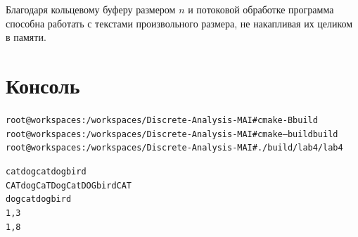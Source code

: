Благодаря кольцевому буферу размером $n$ и потоковой обработке программа способна работать с текстами произвольного размера, не накапливая их целиком в памяти.

\pagebreak

\section{Консоль}

\begin{alltt}
root@workspaces:/workspaces/Discrete-Analysis-MAI# cmake -B build
root@workspaces:/workspaces/Discrete-Analysis-MAI# cmake --build build
root@workspaces:/workspaces/Discrete-Analysis-MAI# ./build/lab4/lab4

cat dog cat dog bird
CAT dog CaT Dog Cat DOG bird CAT
dog cat dog bird
1, 3
1, 8

\end{alltt}

\pagebreak